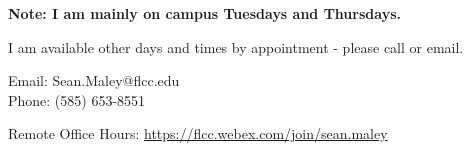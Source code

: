 \documentclass[11pt]{article} %
\begin{document}
	\begin{center}
		
		\textbf{\large Note: I am mainly on campus Tuesdays and Thursdays. } 
		\medskip
		
		I am available other days and times by appointment - please call or email.
		
		\bigskip
		
		 Email: Sean.Maley@flcc.edu\\
		 
		 Phone: (585) 653-8551
			
			Remote Office Hours: \textcolor{blue}{\url{https://flcc.webex.com/join/sean.maley}}
			

			

		
		
%		
%		
%	
	\end{center}
	
	
	
\end{document}
